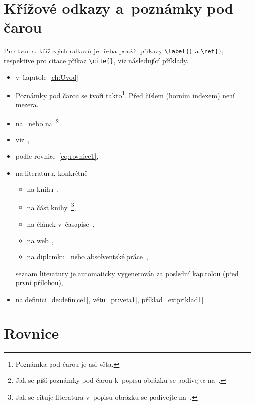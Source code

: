 \section{Křížové odkazy a~poznámky pod čarou}

Pro tvorbu křížových odkazů je třeba použít příkazy \verb"\label{}" a \verb"\ref{}", respektive pro citace příkaz
\verb"\cite{}", viz ná\-sle\-du\-jí\-cí příklady.

\begin{itemize}
    \item v~kapitole~\ref{ch:Uvod}
    \item Poznámky pod čarou se tvoří takto\footnote{Poznámka pod čarou je asi věta.}. Před číslem (horním indexem) není mezera.
    \item na~ nebo na~\footnote{Jak se píší poznámky pod čarou k~popisu obrázku se podívejte na~.}
    \item viz~,
    \item podle rovnice~\eqref{eq:rovnice1},
    \item na literaturu, konkrétně
    \begin{itemize}
        \item na knihu~\cite{Book:ROUBAL-HUSEK-kol_RTvP},
        \item na část knihy~\cite[strana~10]{Book:ROUBAL-HUSEK-kol_RTvP}\footnote{Jak se cituje literatura v~popisu obrázku se podívejte
                na~.},
        \item na článek v~časopise~\cite{Article:ROUBAL-HUSEK-STECHA_LSFOP},
        \item na web~\cite{WWW_Lab26},
        \item na diplomku~\cite{MastersThesis:ROUBAL_BP} nebo absolventské práce~\cite{AbsolventThesis:SIKYR_AP,AbsolventThesis:BOSTICKA_AP,AbsolventThesis:RABINAK_AP,AbsolventThesis:PAVLAT_AP},
    \end{itemize}
        seznam literatury je automaticky vygenerován za poslední kapitolou (před první přílohou),
    \item na definici~\ref{de:definice1}, větu~\ref{pr:veta1}, příklad~\ref{ex:priklad1}.
\end{itemize}



\section{Rovnice}

